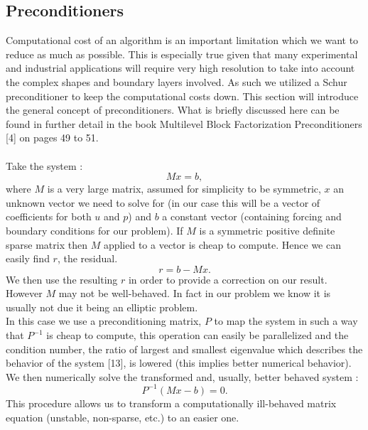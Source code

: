 \documentclass[11pt,twoside,a4paper]{article}
\begin{document}
\subsection{Preconditioners}
Computational cost of an algorithm is an important limitation which we want to reduce as much as possible. This is especially true given that many experimental and industrial applications will require very high resolution to take into account the complex shapes and boundary layers involved. As such we utilized a Schur preconditioner to keep the computational costs down. This section will introduce the general concept of preconditioners. What is briefly discussed here can be found in further detail in the book Multilevel Block Factorization Preconditioners [4] on pages 49 to 51.\\
\\
Take the system :\\
$$
Mx = b ,
$$
where $M$ is a very large matrix, assumed for simplicity to be symmetric, $x$ an unknown vector we need to solve for (in our case this will be a vector of coefficients for both $u$ and $p$) and $b$ a constant vector (containing forcing and boundary conditions for our problem). If $M$ is a symmetric positive definite sparse matrix then $M$ applied to a vector is cheap to compute. Hence we can easily find $r$, the residual.\\
$$
r = b - Mx .
$$
We then use the resulting $r$ in order to provide a correction on our result.\\
However $M$ may not be well-behaved. In fact in our problem we know it is usually not due it being an elliptic problem.\\
In this case we use a preconditioning matrix, $P$ to map the system in such a way that $P^{-1}$ is cheap to compute, this operation can easily be parallelized and the condition number, the ratio of largest and smallest eigenvalue which describes the behavior of the system [13], is lowered (this implies better numerical behavior).\\
We then numerically solve the transformed and, usually, better behaved system :
$$
P^{-1}(Mx-b) = 0 .
$$
This procedure allows us to transform a computationally ill-behaved matrix equation (unstable, non-sparse, etc.) to an easier one.
\end{document}

